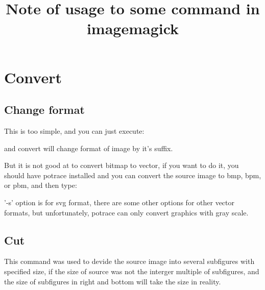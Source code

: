 \documentclass[12pt]{article}
\begin{document}
\title{Note of usage to some command in imagemagick}
\author{}
\maketitle
\tableofcontents
\section{Convert}
\subsection{Change format}
This is too simple, and you can just execute:\vspace{5mm}

{\centering{}\par}\vspace{5mm}

and convert will change format of image by it's suffix.

But it is not good at to convert bitmap to vector, if you want to do it, you should have potrace installed and you can convert the source image to bmp, bpm, or pbm, and then type:\vspace{5mm}

{\centering{}\par}\vspace{5mm}

'-s' option is for svg format, there are some other options for other vector formats, but unfortunately, potrace can only convert graphics with gray scale.
\subsection{Cut}
{\centering{}\par}\vspace{5mm}

This command was used to devide the source image into several subfigures with specified size, if the size of source was not the interger multiple of subfigures, and the size of subfigures in right and bottom will take the size in reality.\\

{\centering{}\par}\vspace{5mm}
\end{document}
